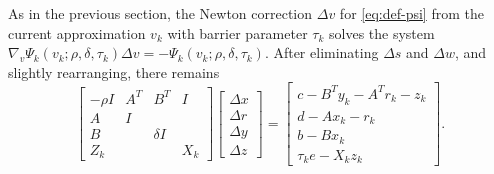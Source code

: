 \documentclass{amsart}
\begin{document}
As in the previous section,
the Newton correction $\Delta v$ for \eqref{eq:def-psi} from the current
approximation $v_k$ with barrier parameter $\tau_k$ solves the system
$\nabla_v \Psi_k(v_k; \rho, \delta, \tau_k) \Delta v = -\Psi_k(v_k; \rho,
\delta, \tau_k)$.
After eliminating $\Delta s$ and $\Delta w$,
and slightly rearranging, there remains
\begin{equation}
  \label{eq:newton-unsym}
  \begin{bmatrix}
    -\rho I & A^T & B^T      & I \\
     A      & I   &          &   \\
     B      &     & \delta I &   \\
     Z_k    &          &     & X_k
  \end{bmatrix}
  \begin{bmatrix}
    \Delta x \\ \Delta r \\ \Delta y \\ \Delta z
  \end{bmatrix}
  =
  \begin{bmatrix}
    c - B^T y_k - A^T r_k - z_k \\
    d - A x_k - r_k \\
    b - B x_k \\
    \tau_k e - X_k z_k
  \end{bmatrix}.
\end{equation}
\end{document}
